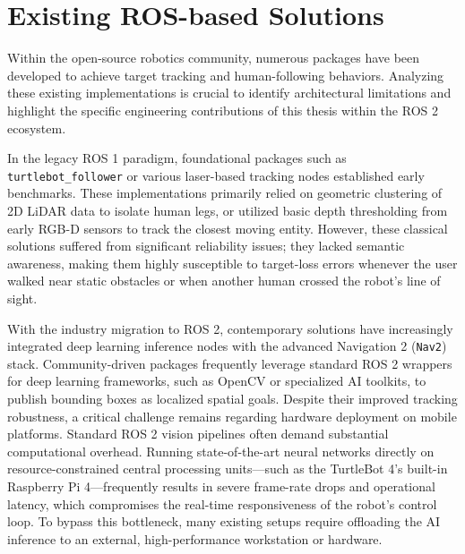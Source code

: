 \section{Existing ROS-based Solutions}
Within the open-source robotics community, numerous packages have been developed to achieve target tracking and human-following behaviors. Analyzing these existing implementations is crucial to identify architectural limitations and highlight the specific engineering contributions of this thesis within the ROS 2 ecosystem.

In the legacy ROS 1 paradigm, foundational packages such as \texttt{turtlebot\_follower} or various laser-based tracking nodes established early benchmarks. These implementations primarily relied on geometric clustering of 2D LiDAR data to isolate human legs, or utilized basic depth thresholding from early RGB-D sensors to track the closest moving entity. However, these classical solutions suffered from significant reliability issues; they lacked semantic awareness, making them highly susceptible to target-loss errors whenever the user walked near static obstacles or when another human crossed the robot's line of sight.

With the industry migration to ROS 2, contemporary solutions have increasingly integrated deep learning inference nodes with the advanced Navigation 2 (\texttt{Nav2}) stack. Community-driven packages frequently leverage standard ROS 2 wrappers for deep learning frameworks, such as OpenCV or specialized AI toolkits, to publish bounding boxes as localized spatial goals. Despite their improved tracking robustness, a critical challenge remains regarding hardware deployment on mobile platforms. Standard ROS 2 vision pipelines often demand substantial computational overhead. Running state-of-the-art neural networks directly on resource-constrained central processing units—such as the TurtleBot 4’s built-in Raspberry Pi 4—frequently results in severe frame-rate drops and operational latency, which compromises the real-time responsiveness of the robot's control loop. To bypass this bottleneck, many existing setups require offloading the AI inference to an external, high-performance workstation or hardware.


